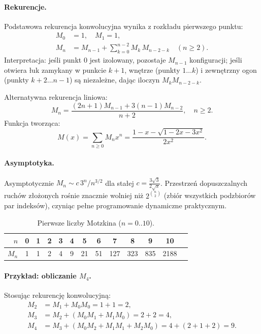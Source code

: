 \paragraph{Rekurencje.}
Podstawowa rekurencja konwolucyjna wynika z rozkładu pierwszego punktu:
\begin{equation}\label{eq_m_n}
\begin{aligned}
M_0 &= 1,\quad M_1 = 1,\\
M_n &= M_{n-1} + \sum_{k=0}^{n-2} M_k\, M_{n-2-k} \quad (n \ge 2).
\end{aligned}
\end{equation}
Interpretacja: jeśli punkt 0 jest izolowany, pozostaje $M_{n-1}$ konfiguracji; jeśli otwiera łuk zamykany w punkcie $k+1$, wnętrze (punkty $1\ldots k$) i zewnętrzny ogon (punkty $k+2\ldots n-1$) są niezależne, dając iloczyn $M_k M_{n-2-k}$.

Alternatywna rekurencja liniowa:
\begin{equation}\label{eq_m_n_req}
M_n = \frac{(2n+1)M_{n-1} + 3(n-1)M_{n-2}}{n+2},\quad n \ge 2.
\end{equation}
Funkcja tworząca:
\begin{equation}\label{eq_m_n_func}
M(x) = \sum_{n\ge0} M_n x^n = \frac{1 - x - \sqrt{1 - 2x - 3x^2}}{2x^2}.
\end{equation}
\paragraph{Asymptotyka.}
Asymptotycznie $M_n \sim c\,3^n / n^{3/2}$ dla stałej $c = \frac{3\sqrt{3}}{2\sqrt{\pi}}$. Przestrzeń dopuszczalnych ruchów złożonych rośnie znacznie wolniej niż $2^{\binom{n}{2}}$ (zbiór wszystkich podzbiorów par indeksów), czyniąc pełne programowanie dynamiczne praktycznym.

\begin{table}[ht]
  \centering
  \caption{Pierwsze liczby Motzkina ($n=0..10$).}
  \begin{tabular}{@{}rcccccccccccc@{}}
    \toprule
    $n$ & 0 & 1 & 2 & 3 & 4 & 5 & 6 & 7 & 8 & 9 & 10 \\
    \midrule
    $M_n$ & 1 & 1 & 2 & 4 & 9 & 21 & 51 & 127 & 323 & 835 & 2188 \\
    \bottomrule
  \end{tabular}
\end{table}

\paragraph{Przykład: obliczanie $M_4$.}
Stosując rekurencję konwolucyjną:
\begin{equation}\label{eq_m_2/3/4}
\begin{aligned}
M_2 &= M_1 + M_0 M_0 = 1 + 1 = 2, \\
M_3 &= M_2 + (M_0 M_1 + M_1 M_0) = 2 + 2 = 4, \\
M_4 &= M_3 + (M_0 M_2 + M_1 M_1 + M_2 M_0) = 4 + (2 + 1 + 2) = 9.
\end{aligned}
\end{equation}

